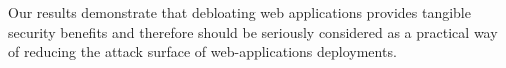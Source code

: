 Our results demonstrate that debloating web applications
provides tangible security benefits and therefore should be seriously
considered as a practical way of reducing the attack surface of
web-applications deployments.


